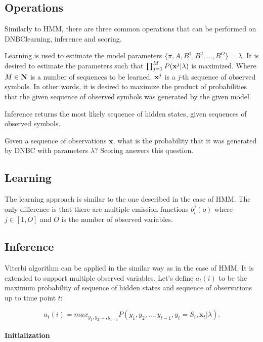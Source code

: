 \documentclass[thesis=B,english]{FITthesis}[2012/06/26]
\begin{document}
\subsection{Operations}

Similarly to HMM, there are three common operations that can be performed on DNBC\textemdash learning, inference and scoring.

Learning is used to estimate the model parameters $\{\pi,A,B^1,B^2,\dots,B^O\} = \lambda$. It is desired to estimate the parameters such that $\prod_{j=1}^{M} P(\textbf x^j | \lambda )$ is maximized. Where $M \in \textbf N$ is a number of sequences to be learned. $\textbf x^j$ is a \emph{j}-th sequence of observed symbols. In other words, it is desired to maximize the product of probabilities that the given sequence of observed symbols was generated by the given model.

Inference returns the most likely sequence of hidden states, given sequences of observed symbols.

Given a sequence of observations $\textbf{x}$, what is the probability that it was generated by DNBC with parameters $\lambda$? Scoring answers this question.

\subsection{Learning}

The learning approach is similar to the one described in the case of HMM. The only difference is that there are multiple emission functions $b^j_i(o)$ where $j \in [1,O]$ and $O$ is the number of observed variables.

\subsection{Inference}

Viterbi algorithm can be applied in the similar way as in the case of HMM. It is extended to support multiple observed variables. Let's define $a_t(i)$ to be the maximum probability of sequence of hidden states and sequence of observations up to time point $t$:

\begin{equation} \label{eq:dnbc_viterbi_a}
a_t(i) = max_{y_1,y_2,\dots,y_{t-1}} P(y_1,y_2,\dots,y_{t-1},y_t = S_i,\textbf{x}_t| \lambda).
\end{equation}

\paragraph{Initialization}
\end{document}
